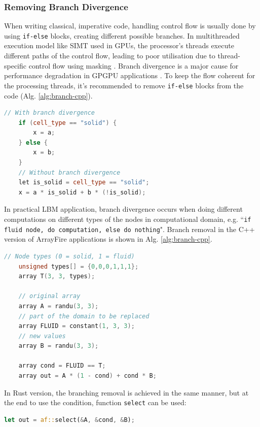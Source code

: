 \subsubsection{Removing Branch Divergence}
When writing classical, imperative code, handling control flow is usually done by using \texttt{if-else} blocks, creating different possible branches. In multithreaded execution model like SIMT used in GPUs, the processor's threads execute different paths of the control flow, leading to poor utilisation due to thread-specific control flow using masking \cite{delboscOptimizedImplementationLattice2014}. Branch divergence is a major cause for performance degradation in GPGPU applications \cite{TAN2017649}. To keep the flow coherent for the processing threads, it's recommended to remove \texttt{if-else} blocks from the code (Alg. \ref{alg:branch-cpp}).

\begin{lstlisting}[language=Cpp, caption=Pseudo-code showcasing the removal of branch divergence by removing if statement., label=alg:branch-pseudo]
	// With branch divergence
	if (cell_type == "solid") {
		x = a;
	} else {
		x = b;
	}
	// Without branch divergence
	let is_solid = cell_type == "solid";
	x = a * is_solid + b * (!is_solid);
\end{lstlisting}

In practical LBM application, branch divergence occurs when doing different computations on different types of the nodes in computational domain, e.g. ``\texttt{if fluid node, do computation, else do nothing}". Branch removal in the C++ version of ArrayFire applications is shown in Alg. \ref{alg:branch-cpp}.

\begin{lstlisting}[language=Cpp, caption=Example C++ code of removing branch divergence using ArrayFire., label=alg:branch-cpp]
	// Node types (0 = solid, 1 = fluid)
	unsigned types[] = {0,0,0,1,1,1};
	array T(3, 3, types);
	
	// original array
	array A = randu(3, 3);
	// part of the domain to be replaced
	array FLUID = constant(1, 3, 3);
	// new values
	array B = randu(3, 3);
	
	array cond = FLUID == T;
	array out = A * (1 - cond) + cond * B;
\end{lstlisting}

In Rust version, the branching removal is achieved in the same manner, but at the end to use the condition, function \texttt{select} can be used:

\begin{lstlisting}[language=Rust, caption=Example Rust code of removing branch divergence using ArrayFire., label=alg:branch-rust]
	let out = af::select(&A, &cond, &B);
\end{lstlisting}

